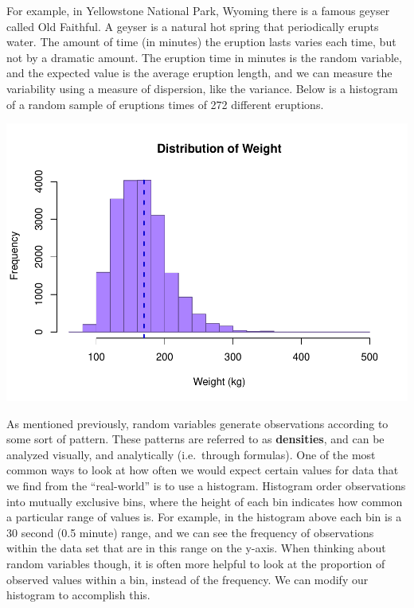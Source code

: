 \documentclass[
]{book}
\newenvironment{Shaded}{\begin{snugshade}}{\end{snugshade}}
\newcommand{\DataTypeTok}[1]{\textcolor[rgb]{0.13,0.29,0.53}{#1}}
\newcommand{\DecValTok}[1]{\textcolor[rgb]{0.00,0.00,0.81}{#1}}
\newcommand{\FloatTok}[1]{\textcolor[rgb]{0.00,0.00,0.81}{#1}}
\newcommand{\KeywordTok}[1]{\textcolor[rgb]{0.13,0.29,0.53}{\textbf{#1}}}
\newcommand{\NormalTok}[1]{#1}
\newcommand{\OperatorTok}[1]{\textcolor[rgb]{0.81,0.36,0.00}{\textbf{#1}}}
\newcommand{\StringTok}[1]{\textcolor[rgb]{0.31,0.60,0.02}{#1}}
\begin{document}
For example, in Yellowstone National Park, Wyoming there is a famous geyser called Old Faithful. A geyser is a natural hot spring that periodically erupts water. The amount of time (in minutes) the eruption lasts varies each time, but not by a dramatic amount. The eruption time in minutes is the random variable, and the expected value is the average eruption length, and we can measure the variability using a measure of dispersion, like the variance. Below is a histogram of a random sample of eruptions times of 272 different eruptions.

\begin{Shaded}
\end{Shaded}

\includegraphics{_main_files/figure-latex/unnamed-chunk-212-1.pdf}

As mentioned previously, random variables generate observations according to some sort of pattern. These patterns are referred to as \textbf{densities}, and can be analyzed visually, and analytically (i.e.~through formulas). One of the most common ways to look at how often we would expect certain values for data that we find from the ``real-world'' is to use a histogram. Histogram order observations into mutually exclusive bins, where the height of each bin indicates how common a particular range of values is. For example, in the histogram above each bin is a 30 second (0.5 minute) range, and we can see the frequency of observations within the data set that are in this range on the y-axis. When thinking about random variables though, it is often more helpful to look at the proportion of observed values within a bin, instead of the frequency. We can modify our histogram to accomplish this.
\end{document}
